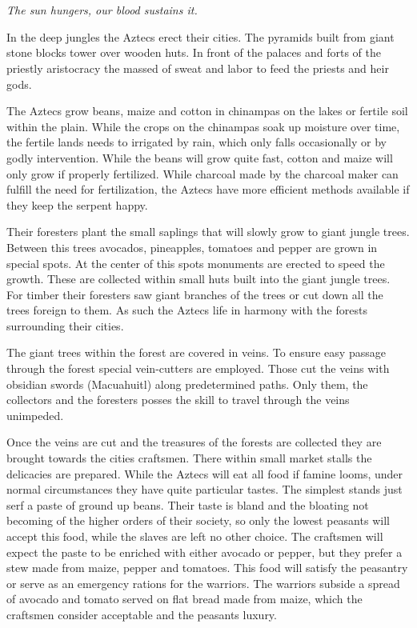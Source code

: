 \section{}\label{ch:Tribes:Atztecs}

\begin{flushright}
	\emph{The sun hungers, our blood sustains it.}
\end{flushright}

In the deep jungles the \gls{Aztecs} erect their cities. The pyramids built
from giant stone blocks tower over wooden huts. In front of the palaces and
forts of the priestly aristocracy the massed of sweat and labor to feed the
priests and heir gods.

The \gls{Aztecs} grow beans, maize and cotton in chinampas on the lakes or
fertile soil within the plain. While the crops on the chinampas soak up
moisture over time, the fertile lands needs to irrigated by rain, which only
falls occasionally or by godly intervention. While the beans will grow quite
fast, cotton and maize will only grow if properly fertilized. While charcoal
made by the charcoal maker can fulfill the need for fertilization, the
\gls{Aztecs} have more efficient methods available if they keep the serpent
happy.

Their foresters plant the small saplings that will slowly grow to giant jungle
trees. Between this trees avocados, pineapples, tomatoes and pepper are grown
in special spots. At the center of this spots monuments are erected to speed
the growth. These are collected within small huts built into the giant jungle
trees. For timber their foresters saw giant branches of the trees or cut down
all the trees foreign to them. As such the \gls{Aztecs} life in harmony with
the forests surrounding their cities.

The giant trees within the forest are covered in veins. To ensure easy passage
through the forest special vein-cutters are employed. Those cut the veins with
obsidian swords (Macuahuitl) along predetermined paths. Only them, the
collectors and the foresters posses the skill to travel through the veins
unimpeded.

Once the veins are cut and the treasures of the forests are collected they are
brought towards the cities craftsmen. There within small market stalls the
delicacies are prepared. While the \gls{Aztecs} will eat all food if famine
looms, under normal circumstances they have quite particular tastes. The
simplest stands just serf a paste of ground up beans. Their taste is bland and
the bloating not becoming of the higher orders of their society, so only the
lowest peasants will accept this food, while the slaves are left no other
choice. The craftsmen will expect the paste to be enriched with either avocado
or pepper, but they prefer a stew made from maize, pepper and tomatoes. This
food will satisfy the peasantry or serve as an emergency rations for the
warriors. The warriors subside a spread of avocado and tomato served on flat
bread made from maize, which the craftsmen consider acceptable and the peasants
luxury.

